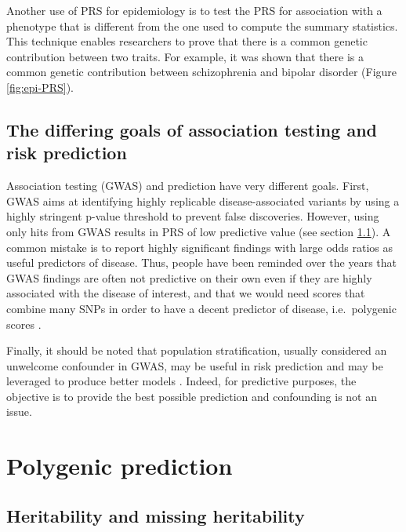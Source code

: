 Another use of PRS for epidemiology is to test the PRS for association with a phenotype that is different from the one used to compute the summary statistics.
This technique enables researchers to prove that there is a common genetic contribution between two traits. 
For example, it was shown that there is a common genetic contribution between schizophrenia and bipolar disorder (Figure \ref{fig:epi-PRS}). 


\subsection{The differing goals of association testing and risk prediction}

Association testing (GWAS) and prediction have very different goals.
First, GWAS aims at identifying highly replicable disease-associated variants by using a highly stringent p-value threshold to prevent false discoveries. However, using only hits from GWAS results in PRS of low predictive value (see section \ref{sec:missing}). 
A common mistake is to report highly significant findings with large odds ratios as useful predictors of disease. 
Thus, people have been reminded over the years that GWAS findings are often not predictive on their own even if they are highly associated with the disease of interest, and that we would need scores that combine many SNPs in order to have a decent predictor of disease, i.e.\ polygenic scores \cite[]{pepe2004limitations,janssens2006predictive,jakobsdottir2009interpretation,wald2019illusion}.

Finally, it should be noted that population stratification, usually considered an unwelcome confounder in GWAS, may be useful in risk prediction and may be leveraged to produce better models \cite[]{golan2014effective,abraham2015genomic}.
Indeed, for predictive purposes, the objective is to provide the best possible prediction and confounding is not an issue.


\section{Polygenic prediction}

\subsection{Heritability and missing heritability} \label{sec:missing}

